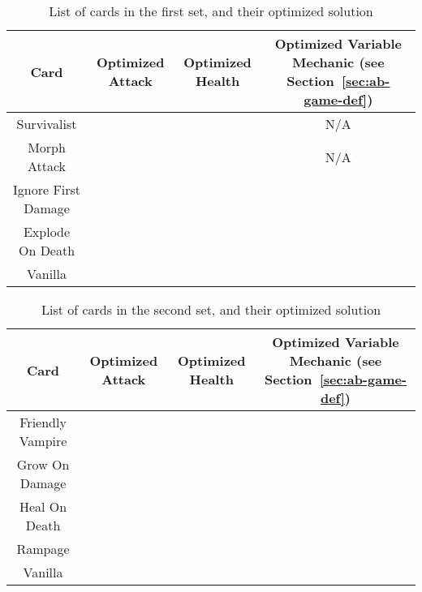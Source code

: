 
\begin{table*}[t]
\centering
\begin{tabular}{||c c c c||} 
 \hline
 Card & Optimized Attack & Optimized Health & Optimized Variable Mechanic (see Section~\ref{sec:ab-game-def})\\ [0.5ex]
 \hline
 Survivalist &  &  & N/A \\
 \hline
 Morph Attack &  &  & N/A \\
 \hline
 Ignore First Damage &  &  & \\
 \hline
 Explode On Death &  &  &  \\ 
 \hline
 Vanilla &  &  &  \\
 \hline
\end{tabular}
\caption{List of cards in the first set, and their optimized solution}
\label{tab:first_set}
\end{table*}

\begin{table*}[t]
\centering
\begin{tabular}{||c c c c||} 
 \hline
 Card & Optimized Attack & Optimized Health & Optimized Variable Mechanic (see Section~\ref{sec:ab-game-def})\\ [0.5ex]
 \hline
 Friendly Vampire &  &  &  \\
 \hline
 Grow On Damage &  &  &  \\
 \hline
 Heal On Death &  &  & \\
 \hline
 Rampage &  &  &  \\ 
 \hline
 Vanilla &  &  &  \\
 \hline
\end{tabular}
\caption{List of cards in the second set, and their optimized solution}
\label{tab:second_set}
\end{table*}


